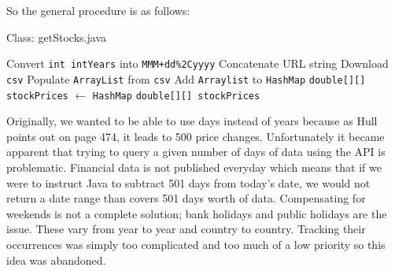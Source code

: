 \documentclass[../Dissertation.tex]{subfiles}
\begin{document}
So the general procedure is as follows:
					\begin{algorithm}[H]
						\caption{Class: getStocks.java}
						\begin{algorithmic}[1]
							\label{class:getStocks}							
							\State Convert \lstinline|int intYears| into \lstinline|MMM+dd%2Cyyyy|
							\State Concatenate URL string
							\State Download \lstinline|csv|
							\State Populate \lstinline|ArrayList| from \lstinline|csv|
							\State Add \lstinline|Arraylist| to \lstinline|HashMap|
							\EndFor
							\State \lstinline|double[][] stockPrices| $\gets$ \lstinline|HashMap|
							\State \Return \lstinline|double[][] stockPrices|
						\EndFunction
						\end{algorithmic}
					\end{algorithm}

Originally, we wanted to be able to use days instead of years because as Hull~\cite{Hull:2012} points out on page 474, it leads to 500 price changes.
Unfortunately it became apparent that trying to query a given number of days of data using the API is problematic.
Financial data is not published everyday which means that if we were to instruct Java to subtract 501 days from today's date, we would not return a date range than covers 501 days worth of data.
Compensating for weekends is not a complete solution; bank holidays and public holidays are the issue.
These vary from year to year and country to country. 
Tracking their occurrences was simply too complicated and too much of a low priority so this idea was abandoned.
\end{document}
